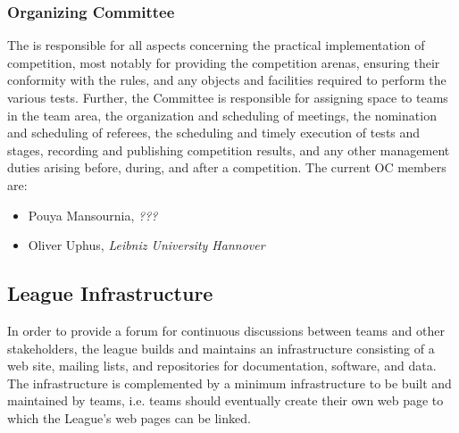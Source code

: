 \subsubsection{Organizing Committee}
The  is responsible for all aspects concerning the practical implementation of competition, most notably for providing the competition arenas, ensuring their conformity with the rules, and any objects and facilities required to perform the various tests. Further, the Committee is responsible for assigning space to teams in the team area, the organization and scheduling of meetings, the nomination and scheduling of referees, the scheduling and timely execution of tests and stages, recording and publishing competition results, and any other management duties arising before, during, and after a competition. The current OC members are:

\begin{itemize}
		\item Pouya Mansournia, \textit{???}
    \item Oliver Uphus, \textit{Leibniz University Hannover}
\end{itemize}






\subsection{League Infrastructure}
In order to provide a forum for continuous discussions between teams and other stakeholders, the league builds and maintains an infrastructure consisting of a web site, mailing lists, and repositories for documentation, software, and data. The infrastructure is complemented by a minimum infrastructure to be built and maintained by teams, i.e. teams should eventually create their own web page to which the \RCAW League's web pages can be linked.

